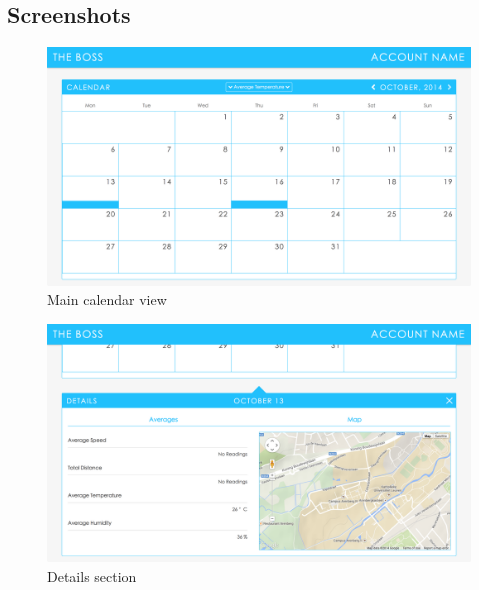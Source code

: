 \subsection{Screenshots}
\label{subsection:screenshots}
\begin{figure}[H]
\center
 \includegraphics[width=\linewidth]{attachments/screenshots/CalendarView.tiff}
 \caption{Main calendar view}
 \label{image:screenshot1}
\end{figure}
\begin{figure}[H]
\center
 \includegraphics[width=\linewidth]{attachments/screenshots/DetailsSection.tiff}
 \caption{Details section}
 \label{image:screenshot2}
\end{figure} 
